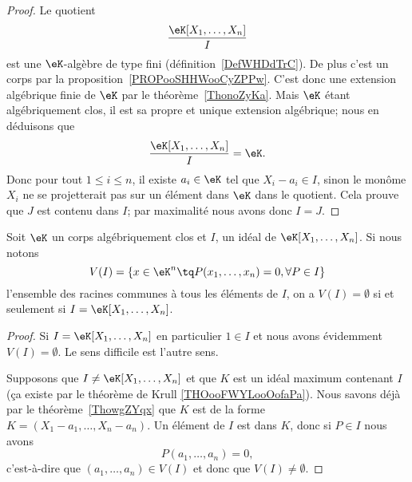 \begin{proof}
	Le quotient
	\begin{equation}
		\frac{ \eK[X_1,\ldots, X_n] }{ I }
	\end{equation}
	est une \( \eK\)-algèbre de type fini (définition~\ref{DefWHDdTrC}). De plus c'est un corps par la proposition~\ref{PROPooSHHWooCyZPPw}. C'est donc une extension algébrique finie de \( \eK\) par le théorème~\ref{ThonoZyKa}. Mais \( \eK\) étant algébriquement clos, il est sa propre et unique extension algébrique; nous en déduisons que
	\begin{equation}
		\frac{ \eK[X_1,\ldots, X_n] }{ I }=\eK.
	\end{equation}
	Donc pour tout \( 1\leq i\leq n\), il existe \( a_i\in \eK\) tel que \( X_i-a_i\in I\), sinon le monôme \( X_i\) ne se projetterait pas sur un élément dans \( \eK\) dans le quotient. Cela prouve que \( J\) est contenu dans \( I\); par maximalité nous avons donc \( I=J\).
\end{proof}

\begin{corollary}
	Soit \( \eK\) un corps algébriquement clos et \( I\), un idéal de \( \eK[X_1,\ldots, X_n]\). Si nous notons
	\begin{equation}
		V(I)=\{ x\in \eK^n\tq P(x_1,\ldots, x_n)=0,\forall P\in I \}
	\end{equation}
	l'ensemble des racines communes à tous les éléments de \( I\), on a \( V(I)=\emptyset\) si et seulement si \( I=\eK[X_1,\ldots, X_n]\).
\end{corollary}

\begin{proof}
	Si \( I=\eK[X_1,\ldots, X_n]\) en particulier \( 1\in I\) et nous avons évidemment \( V(I)=\emptyset\). Le sens difficile est l'autre sens.

    Supposons que \( I\neq \eK[X_1,\ldots, X_n]\) et que \( K\) est un idéal maximum contenant \( I\) (ça existe par le théorème de Krull \ref{THOooFWYLooOofaPa}). Nous savons déjà par le théorème~\ref{ThowgZYqx} que \( K\) est de la forme \( K=(X_1-a_1,\ldots, X_n-a_n)\). Un élément de \( I\) est dans \( K\), donc si \( P\in I\) nous avons
	\begin{equation}
		P(a_1,\ldots, a_n)=0,
	\end{equation}
	c'est-à-dire que \( (a_1,\ldots, a_n)\in V(I)\) et donc que \( V(I)\neq \emptyset \).
\end{proof}

